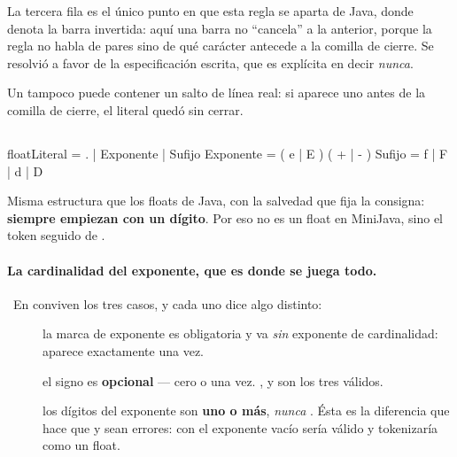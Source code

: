 \documentclass[11pt,a4paper]{article}
\begin{document}
\medskip
La tercera fila es el único punto en que esta regla se aparta de Java, donde  denota
la barra invertida: aquí una barra no ``cancela'' a la anterior, porque la regla no habla de pares
sino de qué carácter antecede a la comilla de cierre. Se resolvió a favor de la especificación
escrita, que es explícita en decir \emph{nunca}.

Un  tampoco puede contener un salto de línea real: si aparece uno antes de la comilla
de cierre, el literal quedó sin cerrar.

\subsection{}

\begin{er}
floatLiteral =  .   
\phantom{floatLiteral }|  Exponente 
\phantom{floatLiteral }|  Sufijo
\medskip
Exponente = ( e | E ) ( + | - ) 
Sufijo\phantom{nte} = f | F | d | D
\end{er}

Misma estructura que los floats de Java, con la salvedad que fija la consigna: \textbf{siempre
empiezan con un dígito}. Por eso  no es un float en MiniJava, sino el token 
seguido de .

\paragraph{La cardinalidad del exponente, que es donde se juega todo.}\notaKleene\ En
\lex{ } conviven los tres casos, y cada
uno dice algo distinto:

\begin{description}
\item[] la marca de exponente es obligatoria y va \emph{sin} exponente de
  cardinalidad: aparece exactamente una vez.
\item[\lex{( + | - )}] el signo es \textbf{opcional} --- cero o una vez. ,
   y  son los tres válidos.
\item[] los dígitos del exponente son \textbf{uno o más}, \emph{nunca}
  . Ésta es la diferencia que hace que  y  sean errores: con
  \sups{*} el exponente vacío sería válido y  tokenizaría como un float.
\end{description}
\end{document}
